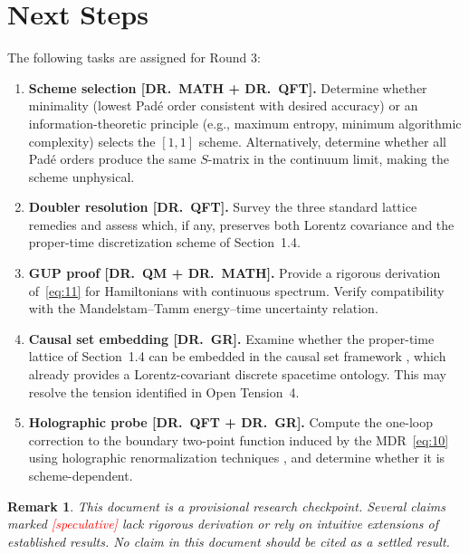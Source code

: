 \documentclass[11pt,a4paper]{article}
\newtheorem{remark}{Remark}
\begin{document}
\section{Next Steps}

The following tasks are assigned for Round 3:

\begin{enumerate}
  \item \textbf{Scheme selection [DR.~MATH + DR.~QFT].} Determine whether minimality (lowest Pad\'{e} order consistent with desired accuracy) or an information-theoretic principle (e.g., maximum entropy, minimum algorithmic complexity) selects the $[1,1]$ scheme. Alternatively, determine whether all Pad\'{e} orders produce the same $S$-matrix in the continuum limit, making the scheme unphysical.

  \item \textbf{Doubler resolution [DR.~QFT].} Survey the three standard lattice remedies and assess which, if any, preserves both Lorentz covariance and the proper-time discretization scheme of Section~1.4.

  \item \textbf{GUP proof [DR.~QM + DR.~MATH].} Provide a rigorous derivation of~\eqref{eq:11} for Hamiltonians with continuous spectrum. Verify compatibility with the Mandelstam--Tamm energy--time uncertainty relation.

  \item \textbf{Causal set embedding [DR.~GR].} Examine whether the proper-time lattice of Section~1.4 can be embedded in the causal set framework \cite{henson2006}, which already provides a Lorentz-covariant discrete spacetime ontology. This may resolve the tension identified in Open Tension~4.

  \item \textbf{Holographic probe [DR.~QFT + DR.~GR].} Compute the one-loop correction to the boundary two-point function induced by the MDR~\eqref{eq:10} using holographic renormalization techniques \cite{skenderis2002}, and determine whether it is scheme-dependent.
\end{enumerate}

\begin{remark}
This document is a \emph{provisional research checkpoint}. Several claims marked \textcolor{red}{[speculative]} lack rigorous derivation or rely on intuitive extensions of established results. No claim in this document should be cited as a settled result.
\end{remark}
\end{document}
